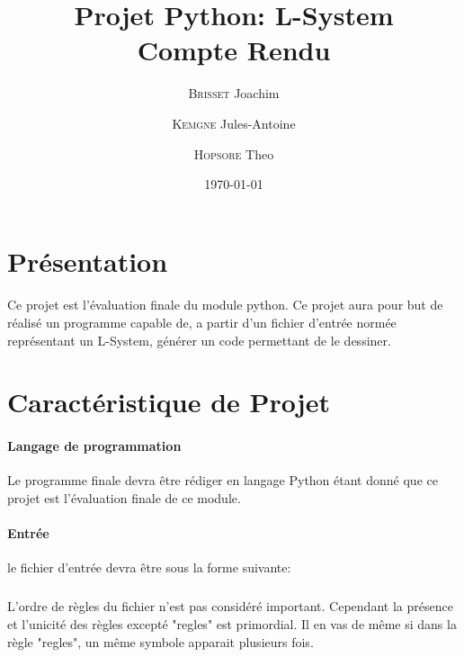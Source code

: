 \documentclass{report}
\title{Projet Python: L-System \\ Compte Rendu}
\author{\textsc{Brisset} Joachim \and \textsc{Kemgne} Jules-Antoine \and \textsc{Hopsore} Theo}
\date{\today}
\begin{document}
	\maketitle
	\clearpage
	
	\tableofcontents{\thispagestyle{fancy}}
	\clearpage
	
	\section{Présentation}
		\paragraph{}
			Ce projet est l'évaluation finale du module python. Ce projet aura pour but de réalisé un programme capable de, a partir d'un fichier d'entrée normée représentant un L-System, générer un code permettant de le dessiner.
	\section{Caractéristique de Projet}
		\paragraph{Langage de programmation}
			Le programme finale devra être rédiger en langage Python étant donné que ce projet est l'évaluation finale de ce module.
		\paragraph{Entrée}
			le fichier d'entrée devra être sous la forme suivante: \\

	
			\subparagraph{} L'ordre de règles du fichier n'est pas considéré important. Cependant la présence et l'unicité des règles excepté "regles" est primordial. Il en vas de même si dans la règle "regles", un même symbole apparait plusieurs fois.
		
\end{document}
